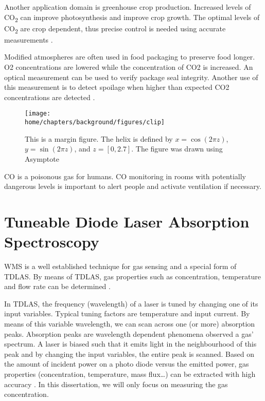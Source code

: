 \documentclass[\home/main.tex]{subfiles}
\begin{document}
  Another application domain is greenhouse crop production. Increased levels of CO\textsubscript{2} can improve photosynthesis and improve crop growth. The optimal levels of CO\textsubscript{2} are crop dependent, thus precise control is needed using accurate measurements \cite{nederhoff1994effects}.
  
  Modified atmospheres are often used in food packaging to preserve food longer. \acrshort{O2} concentrations are lowered while the concentration of \acrshort{CO2} is increased. An optical measurement can be used to verify package seal integrity. Another use of this measurement is to detect spoilage when higher than expected \acrshort{CO2} concentrations are detected \cite{CO2-food-preservation,CO2-food-sensors}.
  
  \begin{figure}
  	\centering
  	\texttt{[image: \\home/chapters/background/figures/clip]}
  	\caption{This is a margin figure. The helix is defined by $x = \cos(2\pi z)$, $y = \sin(2\pi z)$, and $z = [0, 2.7]$. The figure was drawn using Asymptote} 
  	\label{fig:clip}
  \end{figure}
  
  \acrshort{CO} is a poisonous gas for humans. \acrshort{CO} monitoring in rooms with potentially dangerous levels is important to alert people and activate ventilation if necessary. 

\section{Tuneable Diode Laser Absorption Spectroscopy}

  \Acrfull{WMS} is a well established technique for gas sensing and a special form of \acrfull{TDLAS}. By means of \acrshort{TDLAS}, gas properties such as concentration, temperature and flow rate can be determined \cite{WMSTemperature,TDLASVelocity,OpticalGasSensingReview}.

  In \acrshort{TDLAS}, the frequency (wavelength) of a laser is tuned by changing one of its input variables. Typical tuning factors are temperature and input current. By means of this variable wavelength, we can scan across one (or more) absorption peaks. Absorption peaks are wavelength dependent phenomena observed a gas' spectrum. A laser is biased such that it emits light in the neighbourhood of this peak and by changing the input variables, the entire peak is scanned. Based on the amount of incident power on a photo diode versus the emitted power, gas properties (concentration, temperature, mass flux\ldots) can be extracted with high accuracy \cite{OpticalGasSensingReview}. In this dissertation, we will only focus on measuring the gas concentration.
\end{document}
